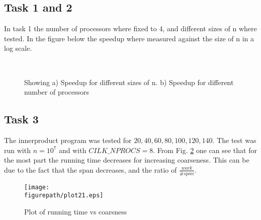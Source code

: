  \newcommand{\figurepath}{./figures/}
\newcommand{\figurescale}{0.53}
\newcommand{\codepath}{../matlab/}


\subsection*{Task 1 and 2}

In task 1 the number of processors where fixed to 4, and different sizes of n where tested. In the figure below the speedup where measured against the size of n in a log scale.

\begin{figure}[h!] 
 \center 
  \\
 \caption{ Showing a) Speedup for different sizes of n. b) Speedup for different number of processors \label{fig:}}
 \end{figure}


\clearpage

\subsection*{Task 3}

The innerproduct program was tested for $ 20 , 40 , 60, 80, 100, 120, 140 $. The test was run with $n=10^7$ and with $CILK\_NPROCS=8$. From Fig. \ref{fig:co} one can see that for the most part the running time decreases for increasing coarseness. This can be due to the fact that the span decreases, and the ratio of $ \frac{work}{\#span} $.


\begin{figure}[h!] 
 \center 
 \texttt{[image: \\figurepath/plot21.eps]}
 \caption{ Plot of running time vs coarsness \label{fig:co}}
 \end{figure}

 

